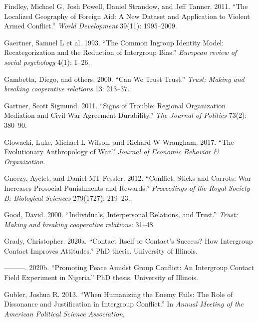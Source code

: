 \documentclass[11pt]{article}
\begin{document}
\leavevmode\hypertarget{ref-findley2011localized}{}%
Findley, Michael G, Josh Powell, Daniel Strandow, and Jeff Tanner. 2011.
``The Localized Geography of Foreign Aid: A New Dataset and Application
to Violent Armed Conflict.'' \emph{World Development} 39(11):
1995--2009.

\leavevmode\hypertarget{ref-gaertner1993common}{}%
Gaertner, Samuel L et al. 1993. ``The Common Ingroup Identity Model:
Recategorization and the Reduction of Intergroup Bias.'' \emph{European
review of social psychology} 4(1): 1--26.

\leavevmode\hypertarget{ref-gambetta_ch13}{}%
Gambetta, Diego, and others. 2000. ``Can We Trust Trust.'' \emph{Trust:
Making and breaking cooperative relations} 13: 213--37.

\leavevmode\hypertarget{ref-gartner2011signs}{}%
Gartner, Scott Sigmund. 2011. ``Signs of Trouble: Regional Organization
Mediation and Civil War Agreement Durability.'' \emph{The Journal of
Politics} 73(2): 380--90.

\leavevmode\hypertarget{ref-glowacki2017evolutionary}{}%
Glowacki, Luke, Michael L Wilson, and Richard W Wrangham. 2017. ``The
Evolutionary Anthropology of War.'' \emph{Journal of Economic Behavior
\& Organization}.

\leavevmode\hypertarget{ref-gneezy2012conflict}{}%
Gneezy, Ayelet, and Daniel MT Fessler. 2012. ``Conflict, Sticks and
Carrots: War Increases Prosocial Punishments and Rewards.''
\emph{Proceedings of the Royal Society B: Biological Sciences}
279(1727): 219--23.

\leavevmode\hypertarget{ref-good2000individuals}{}%
Good, David. 2000. ``Individuals, Interpersonal Relations, and Trust.''
\emph{Trust: Making and breaking cooperative relations}: 31--48.

\leavevmode\hypertarget{ref-grady2020lab}{}%
Grady, Christopher. 2020a. ``Contact Itself or Contact's Success? How
Intergroup Contact Improves Attitudes.'' PhD thesis. University of
Illinois.

\leavevmode\hypertarget{ref-grady2020farmer}{}%
---------. 2020b. ``Promoting Peace Amidst Group Conflict: An Intergroup
Contact Field Experiment in Nigeria.'' PhD thesis. University of
Illinois.

\leavevmode\hypertarget{ref-gubler2013humanizing}{}%
Gubler, Joshua R. 2013. ``When Humanizing the Enemy Fails: The Role of
Dissonance and Justification in Intergroup Conflict.'' In \emph{Annual
Meeting of the American Political Science Association},
\end{document}
